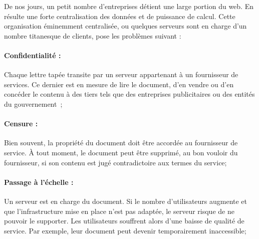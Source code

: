 




De nos jours, un petit nombre d'entreprises détient une large portion du web. En
résulte une forte centralisation des données et de puissance de calcul. Cette
organisation éminemment centralisée, ou quelques serveurs sont en charge d'un
nombre titanesque de clients, pose les problèmes suivant :

 

\paragraph{Confidentialité :} Chaque lettre tapée transite par un serveur
appartenant à un fournisseur de services. Ce dernier est en mesure de lire le
document, d'en vendre ou d'en concéder le contenu à des tiers tels que des
entreprises publicitaires ou des entités du
gouvernement~\cite{cherrueau2016composer, gellman2013us, pearson2011toward};

\paragraph{Censure :} Bien souvent, la propriété du document doit être accordée
au fournisseur de service. À tout moment, le document peut être supprimé, au bon
vouloir du fournisseur, si son contenu est jugé contradictoire aux termes du
service;

\paragraph{Passage à l'échelle :} Un serveur est en charge du document. Si le
nombre d'utilisateurs augmente et que l'infrastructure mise en place n'est pas
adaptée, le serveur risque de ne pouvoir le supporter. Les utilisateurs
souffrent alors d'une baisse de qualité de service. Par exemple, leur document
peut devenir temporairement inaccessible;

